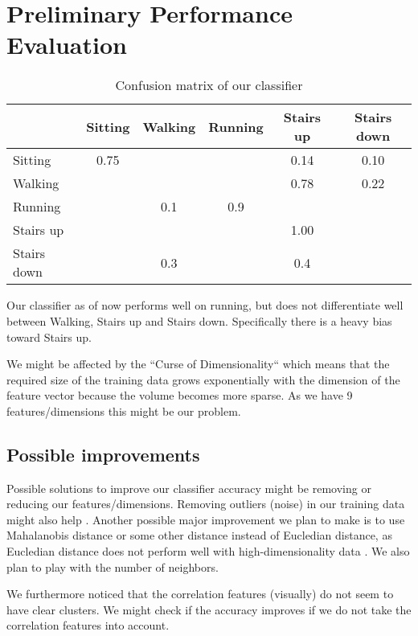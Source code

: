 \section{Preliminary Performance Evaluation}
\label{sec:perf-eval}

\begin{table}[ht]
\centering
\caption{Confusion matrix of our classifier}
\begin{tabular}{lccccc}
\toprule
 & Sitting & Walking & Running & Stairs up & Stairs down\\
\midrule
Sitting & 0.75 &  &  &  0.14 & 0.10\\
Walking &  &  &  & 0.78 & 0.22\\
Running &  & 0.1 & 0.9 &  & \\
Stairs up &  &  &  & 1.00 & \\
Stairs down &  & 0.3 &  & 0.4 & \\
\bottomrule
\end{tabular}
\label{tab:confusion-matrix}
\end{table}


Our classifier as of now performs well on running, but does not differentiate well between Walking, Stairs up and Stairs down. Specifically there is a heavy bias toward Stairs up.

We might be affected by the ``Curse of Dimensionality`` \cite{wikipedia2} which means that the required size of the training data grows exponentially with the dimension of the feature vector because the volume becomes more sparse. As we have 9 features/dimensions this might be our problem.

\subsection{Possible improvements}

Possible solutions to improve our classifier accuracy might be removing or reducing our features/dimensions.
Removing outliers (noise) in our training data might also help \cite{wikipedia1}.
Another possible major improvement we plan to make is to use Mahalanobis distance or some other distance instead of Eucledian distance, as Eucledian distance does not perform well with high-dimensionality data \cite{wikipedia1}.
We also plan to play with the number of neighbors.

We furthermore noticed that the correlation features (visually) do not seem to have clear clusters. We might check if the accuracy improves if we do not take the correlation features into account.